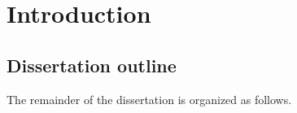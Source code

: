 \chapter{Introduction}
\label{chap-introduction}

\section{Dissertation outline}

The remainder of the dissertation is organized as follows.

